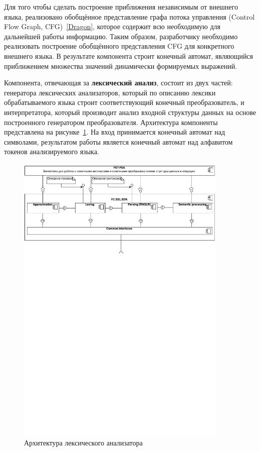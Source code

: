 Для того чтобы сделать построение приближения независимым от внешнего языка, реализовано обобщённое представление графа потока управления (Control Flow Graph, CFG)~\ref{Dragon}, которое содержит всю необходимую для дальнейшей работы информацию. Таким образом, разработчику необходимо реализовать построение обобщённого представления CFG для конкретного внешнего языка. В результате компонента строит конечный автомат, являющийся приближением множества значений динамически формируемых выражений.

Компонента, отвечающая за \textbf{лексический анализ}, состоит из двух частей: генератора лексических анализаторов, который по описанию лексики обрабатываемого языка строит соответствующий конечный преобразователь, и интерпретатора, который производит анализ входной структуры данных на основе построенного генератором преобразователя. Архитектура компоненты представлена на рисунке~\ref{fig:LexArch}. На вход принимается конечный автомат над символами, результатом работы является конечный автомат над алфавитом токенов анализируемого языка.

\begin{figure}[h!]
\begin{center}
\includegraphics[width=0.9\textwidth]{pics/Components}
\caption{Архитектура лексического анализатора}
\label{fig:LexArch} 
\end{center}
\end{figure}

